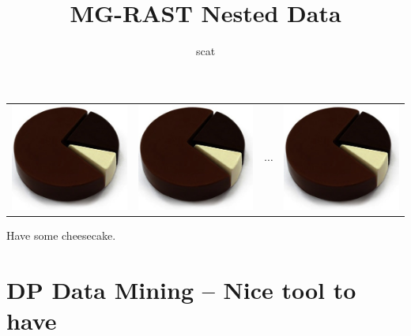 \documentclass[11pt]{article}
\title{MG-RAST Nested Data}
\author{scat}
\begin{document}
\maketitle

\begin{center}
\begin{tabular}{cccc}
   \includegraphics[width=.7in]{pie.jpg} 
   &
   \includegraphics[width=.7in]{pie.jpg} 
   &
   \Huge $\dotsb$
 &
   \includegraphics[width=.7in]{pie.jpg} 
\end{tabular}

Have some cheesecake. 
\end{center}


\section{DP Data Mining -- Nice tool to have}
 
\end{document}
